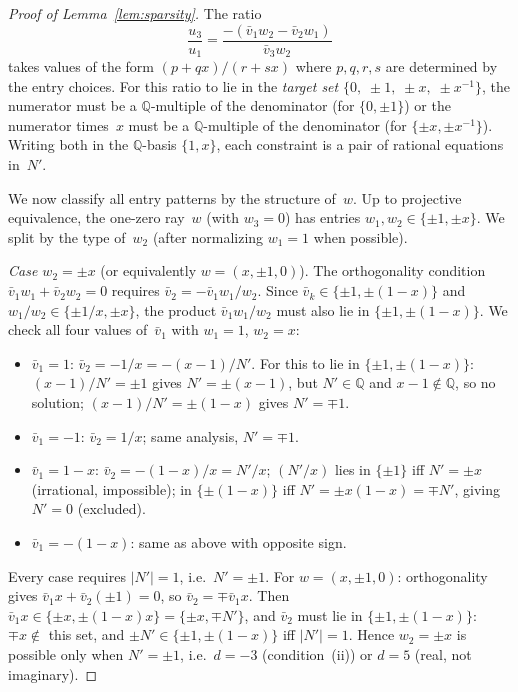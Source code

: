 \documentclass[12pt,a4paper]{article}
\newcommand{\Q}{\mathbb{Q}}
\begin{document}
\begin{proof}[Proof of Lemma~\ref{lem:sparsity}]
The ratio
\[
  \frac{u_3}{u_1}
  = \frac{-(\bar{v}_1 w_2 - \bar{v}_2 w_1)}{\bar{v}_3 w_2}
\]
takes values of the form $(p + qx)/(r + sx)$ where $p, q, r, s$
are determined by the entry choices.  For this ratio to lie in the
\emph{target set} $\{0,\; \pm 1,\; \pm x,\; \pm x^{-1}\}$,
the numerator must be a $\Q$-multiple of the denominator
(for $\{0, \pm 1\}$) or the numerator times~$x$ must be a
$\Q$-multiple of the denominator (for $\{\pm x, \pm x^{-1}\}$).
Writing both in the $\Q$-basis $\{1, x\}$, each constraint is a
pair of rational equations in~$N'$.

We now classify all entry patterns by the structure of~$w$.
Up to projective equivalence, the one-zero ray~$w$ (with $w_3 = 0$)
has entries $w_1, w_2 \in \{\pm 1, \pm x\}$.  We split by the
type of~$w_2$ (after normalizing $w_1 = 1$ when possible).

\emph{Case $w_2 = \pm x$} (or equivalently $w = (x, \pm 1, 0)$).
The orthogonality condition $\bar{v}_1 w_1 + \bar{v}_2 w_2 = 0$
requires $\bar{v}_2 = -\bar{v}_1 w_1/w_2$.  Since
$\bar{v}_k \in \{\pm 1, \pm(1{-}x)\}$ and
$w_1/w_2 \in \{\pm 1/x, \pm x\}$, the product $\bar{v}_1 w_1/w_2$
must also lie in $\{\pm 1, \pm(1{-}x)\}$.  We check all four
values of~$\bar{v}_1$ with $w_1 = 1$, $w_2 = x$:
\begin{itemize}
\item $\bar{v}_1 = 1$: $\bar{v}_2 = -1/x = -(x{-}1)/N'$.
  For this to lie in $\{\pm 1, \pm(1{-}x)\}$: $(x{-}1)/N' = \pm 1$
  gives $N' = \pm(x{-}1)$, but $N' \in \Q$ and $x{-}1 \notin \Q$,
  so no solution; $(x{-}1)/N' = \pm(1{-}x)$ gives $N' = \mp 1$.
\item $\bar{v}_1 = -1$: $\bar{v}_2 = 1/x$; same analysis, $N' = \mp 1$.
\item $\bar{v}_1 = 1{-}x$: $\bar{v}_2 = -(1{-}x)/x = N'/x$;
  $(N'/x)$ lies in $\{\pm 1\}$ iff $N' = \pm x$ (irrational, impossible);
  in $\{\pm(1{-}x)\}$ iff $N' = \pm x(1{-}x) = \mp N'$, giving
  $N' = 0$ (excluded).
\item $\bar{v}_1 = -(1{-}x)$: same as above with opposite sign.
\end{itemize}
Every case requires $|N'| = 1$, i.e.\ $N' = \pm 1$.  For
$w = (x, \pm 1, 0)$: orthogonality gives
$\bar{v}_1 x + \bar{v}_2(\pm 1) = 0$, so
$\bar{v}_2 = \mp\bar{v}_1 x$.  Then $\bar{v}_1 x \in
\{\pm x, \pm(1{-}x)x\} = \{\pm x, \mp N'\}$, and $\bar{v}_2$
must lie in $\{\pm 1, \pm(1{-}x)\}$: $\mp x \notin$ this set,
and $\pm N' \in \{\pm 1, \pm(1{-}x)\}$ iff $|N'| = 1$.
Hence $w_2 = \pm x$ is possible only when $N' = \pm 1$, i.e.\
$d = -3$ (condition~(ii)) or $d = 5$ (real, not imaginary).


\end{proof}
\end{document}
